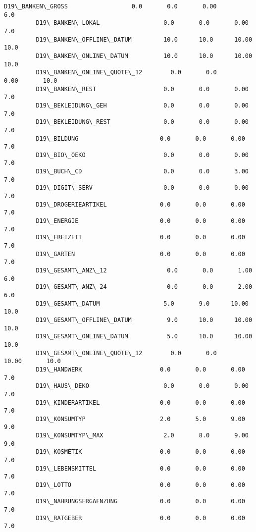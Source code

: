 \documentclass[11pt]{article}
\begin{document}
\begin{Verbatim}[commandchars=\\\{\}]
         D19\_BANKEN\_GROSS                  0.0       0.0       0.00        6.0  
         D19\_BANKEN\_LOKAL                  0.0       0.0       0.00        7.0  
         D19\_BANKEN\_OFFLINE\_DATUM         10.0      10.0      10.00       10.0  
         D19\_BANKEN\_ONLINE\_DATUM          10.0      10.0      10.00       10.0  
         D19\_BANKEN\_ONLINE\_QUOTE\_12        0.0       0.0       0.00       10.0  
         D19\_BANKEN\_REST                   0.0       0.0       0.00        7.0  
         D19\_BEKLEIDUNG\_GEH                0.0       0.0       0.00        7.0  
         D19\_BEKLEIDUNG\_REST               0.0       0.0       0.00        7.0  
         D19\_BILDUNG                       0.0       0.0       0.00        7.0  
         D19\_BIO\_OEKO                      0.0       0.0       0.00        7.0  
         D19\_BUCH\_CD                       0.0       0.0       3.00        7.0  
         D19\_DIGIT\_SERV                    0.0       0.0       0.00        7.0  
         D19\_DROGERIEARTIKEL               0.0       0.0       0.00        7.0  
         D19\_ENERGIE                       0.0       0.0       0.00        7.0  
         D19\_FREIZEIT                      0.0       0.0       0.00        7.0  
         D19\_GARTEN                        0.0       0.0       0.00        7.0  
         D19\_GESAMT\_ANZ\_12                 0.0       0.0       1.00        6.0  
         D19\_GESAMT\_ANZ\_24                 0.0       0.0       2.00        6.0  
         D19\_GESAMT\_DATUM                  5.0       9.0      10.00       10.0  
         D19\_GESAMT\_OFFLINE\_DATUM          9.0      10.0      10.00       10.0  
         D19\_GESAMT\_ONLINE\_DATUM           5.0      10.0      10.00       10.0  
         D19\_GESAMT\_ONLINE\_QUOTE\_12        0.0       0.0      10.00       10.0  
         D19\_HANDWERK                      0.0       0.0       0.00        7.0  
         D19\_HAUS\_DEKO                     0.0       0.0       0.00        7.0  
         D19\_KINDERARTIKEL                 0.0       0.0       0.00        7.0  
         D19\_KONSUMTYP                     2.0       5.0       9.00        9.0  
         D19\_KONSUMTYP\_MAX                 2.0       8.0       9.00        9.0  
         D19\_KOSMETIK                      0.0       0.0       0.00        7.0  
         D19\_LEBENSMITTEL                  0.0       0.0       0.00        7.0  
         D19\_LOTTO                         0.0       0.0       0.00        7.0  
         D19\_NAHRUNGSERGAENZUNG            0.0       0.0       0.00        7.0  
         D19\_RATGEBER                      0.0       0.0       0.00        7.0  

\end{Verbatim}
\end{document}
